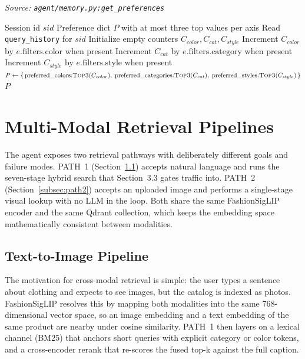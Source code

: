 \begin{algorithm}[H]
\caption{Derive Soft Preferences from Query History}\label{alg:get_preferences}
\textit{Source: \texttt{agent/memory.py:get\_preferences}}
\begin{algorithmic}[1]
\Require Session id $sid$
\Ensure Preference dict $P$ with at most three top values per axis
    \State Read \texttt{query\_history} for $sid$
    \State Initialize empty counters $C_{color}, C_{cat}, C_{style}$
        \State Increment $C_{color}$ by $e.\text{filters.color}$ when present
        \State Increment $C_{cat}$ by $e.\text{filters.category}$ when present
        \State Increment $C_{style}$ by $e.\text{filters.style}$ when present
    \EndFor
    \State $P \gets \{\,\text{preferred\_colors}{:}\textsc{Top3}(C_{color}),\;\text{preferred\_categories}{:}\textsc{Top3}(C_{cat}),\;\text{preferred\_styles}{:}\textsc{Top3}(C_{style})\,\}$
    \State \Return $P$
\EndFunction
\end{algorithmic}
\end{algorithm}

\section{Multi-Modal Retrieval Pipelines}

The agent exposes two retrieval pathways with deliberately different goals and failure modes. PATH~1 (Section~\ref{subsec:path1}) accepts natural language and runs the seven-stage hybrid search that Section~3.3 gates traffic into. PATH~2 (Section~\ref{subsec:path2}) accepts an uploaded image and performs a single-stage visual lookup with no LLM in the loop. Both share the same FashionSigLIP encoder and the same Qdrant collection, which keeps the embedding space mathematically consistent between modalities.

\subsection{Text-to-Image Pipeline}
\label{subsec:path1}

The motivation for cross-modal retrieval is simple: the user types a sentence about clothing and expects to see images, but the catalog is indexed as photos. FashionSigLIP resolves this by mapping both modalities into the same 768-dimensional vector space, so an image embedding and a text embedding of the same product are nearby under cosine similarity. PATH~1 then layers on a lexical channel (BM25) that anchors short queries with explicit category or color tokens, and a cross-encoder rerank that re-scores the fused top-k against the full caption.

